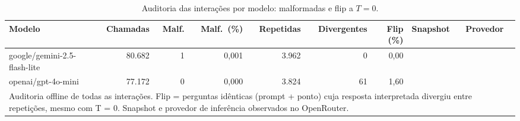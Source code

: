 \begin{table}[htbp]
\centering
\small
\caption{Auditoria das interações por modelo: malformadas e flip a $T=0$.}
\label{tab:final_auditoria_por_modelo}
\begin{tabular}{lrrrrrrll}
\toprule
Modelo & Chamadas & Malf. & Malf.\ (\%) & Repetidas & Divergentes & Flip (\%) & Snapshot & Provedor \\
\midrule
google/gemini-2.5-flash-lite & 80.682 & 1 & 0,001 & 3.962 & 0 & 0,00 &  &  \\
openai/gpt-4o-mini & 77.172 & 0 & 0,000 & 3.824 & 61 & 1,60 &  &  \\
\bottomrule
\multicolumn{9}{p{0.95\linewidth}}{\footnotesize Auditoria offline de todas as interações. Flip = perguntas idênticas (prompt + ponto) cuja resposta interpretada divergiu entre repetições, mesmo com T = 0. Snapshot e provedor de inferência observados no OpenRouter.} \\
\end{tabular}
\end{table}
